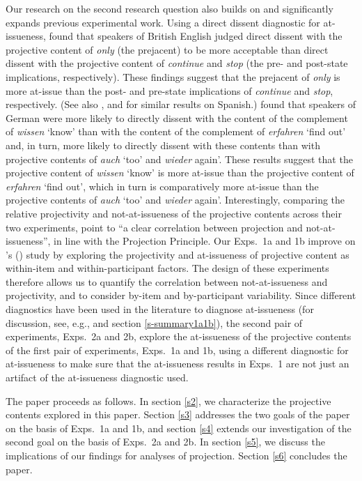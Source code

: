 \documentclass[11pt,fleqn]{article}
\newcommand{\6}{\mbox{$[\hspace*{-.6mm}[$}}
\newcommand{\9}{\mbox{$]\hspace*{-.6mm}]$}}
\newcommand{\citetpos}[1]{\citeauthor{#1}'s (\citeyear{#1})}
\begin{document}
Our research on the second research question also builds on and significantly expands previous experimental work. 
 Using a direct dissent diagnostic for at-issueness, \citet{amaral-etal11} found that speakers of British English judged direct dissent with the projective content of {\em only} (the prejacent) to be more acceptable than direct dissent with the projective content of {\em continue} and {\em stop} (the pre- and post-state implications, respectively). These findings suggest that the prejacent of {\em only} is more at-issue than the post- and pre-state implications of {\em continue} and {\em stop}, respectively. (See also \citealt{cummins-etal2012}, and \citealt{amaral-cummins2015} for similar results on Spanish.) \citet{xue-onea11} found that speakers of German were more likely to directly dissent with the content of the complement of {\em wissen} `know' than with the content of the complement of {\em erfahren} `find out' and, in turn, more likely to directly dissent with these contents than with projective contents of {\em auch} `too' and {\em wieder} again'. These results suggest that the projective content of {\em wissen} `know' is more at-issue than the projective content of {\em erfahren} `find out', which in turn is comparatively more at-issue than the projective contents of {\em auch} `too' and {\em wieder} again'. Interestingly, comparing the relative projectivity and not-at-issueness 
of the projective contents across their two experiments, \citet[180]{xue-onea11} point to ``a clear correlation between projection and not-at-issueness'', in line with the Projection Principle. Our Exps.~1a and 1b improve on \citetpos{xue-onea11} study by exploring the projectivity and at-issueness of projective content as within-item and within-participant factors. The design of these experiments therefore allows us to quantify the correlation between not-at-issueness and projectivity, and to consider by-item and by-participant variability. Since different diagnostics have been used in the literature to diagnose at-issueness (for discussion, see, e.g., \citealt{tonhauser-sula6} and section \ref{s-summary1a1b}), the second pair of experiments, Exps.~2a and 2b, explore the at-issueness of the projective contents of the first pair of experiments, Exps.~1a and 1b, using a different diagnostic for at-issueness to make sure that the at-issueness results in Exps.~1 are not just an artifact of the at-issueness diagnostic used.

The paper proceeds as follows. In section \ref{s2}, we characterize the projective contents explored in this paper. Section \ref{s3} addresses the two goals of the paper on the basis of Exps.~1a and 1b, and section \ref{s4} extends our investigation of the second goal on the basis of Exps.~2a and 2b. In section \ref{s5}, we discuss the implications of our findings for analyses of projection. Section \ref{s6} concludes the paper.
\end{document}
